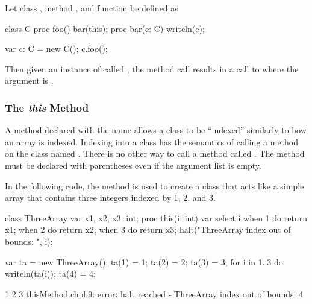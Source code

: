 \begin{example}
Let class , method , and function  be
defined as
\begin{chapelpre}
\end{chapelpre}
\begin{chapel}
class C {
  proc foo() {
    bar(this);
  }
}
proc bar(c: C) { writeln(c); }
\end{chapel}
\begin{chapelpost}
var c: C = new C();
c.foo();
\end{chapelpost}
\begin{chapeloutput}
{}
\end{chapeloutput}
Then given an instance of  called , the method
call  results in a call to  where the argument
is .
\end{example}

\subsubsection{The {\em this} Method}
\label{The_em_this_Method}

A method declared with the name  allows a class to be
``indexed'' similarly to how an array is indexed.  Indexing into a
class has the semantics of calling a method on the class
named .  There is no other way to call a method
called .  The  method must be declared with
parentheses even if the argument list is empty.

\begin{example}
In the following code, the  method is used to create a
class that acts like a simple array that contains three integers
indexed by 1, 2, and 3.
\begin{chapelpre}
\end{chapelpre}
\begin{chapel}
class ThreeArray {
  var x1, x2, x3: int;
  proc this(i: int) var {
    select i {
      when 1 do return x1;
      when 2 do return x2;
      when 3 do return x3;
    }
    halt("ThreeArray index out of bounds: ", i);
  }
}
\end{chapel}
\begin{chapelpost}
var ta = new ThreeArray();
ta(1) = 1;
ta(2) = 2;
ta(3) = 3;
for i in 1..3 do
  writeln(ta(i));
ta(4) = 4;
\end{chapelpost}
\begin{chapeloutput}
1
2
3
thisMethod.chpl:9: error: halt reached - ThreeArray index out of bounds: 4
\end{chapeloutput}
\end{example}

